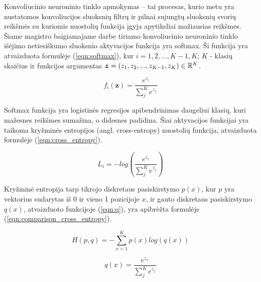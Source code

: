 Konvoliucinio neuroninio tinklo apmokymas -- tai procesas, kurio metu yra nustatomos konvoliucijos sluoksnių filtrų ir pilnai sujungtų sluoksnių svorių reikšmės su kuriomis nuostolių funkcija įgyja apytiksliai mažiausias reikšmes. Šiame magistro baigiamajame darbe tiriamo konvoliucinio neuroninio tinklo išėjimo netiesiškumo sluoksnio aktyvacijos funkcija yra softmax. Ši funkcija yra atvaizduota formulėje (\ref{eqn:softmax}), kur $i = 1, 2, ..., K - 1, K$; $K$ - klasių skaičius ir funkcijos argumentas $\boldsymbol{z} = (z_1, z_2, ..., z_{K - 1}, z_K) \in \mathbb{R}^K$.

\begin{equation}
\label{eqn:softmax}
	f_i(\boldsymbol{z}) = \dfrac{e^{z_i}}{\sum_{j}^{K} e^{z_j}}
\end{equation}

Softmax funkcija yra logistinės regresijos apibendrinimas daugeliui klasių, kuri mažesnes reikšmes sumažina, o didesnes padidina. Šiai aktyvacijos funkcijai yra taikoma kryžminės entropijos (angl. cross-entropy) nuostolių funkcija, atvaizduota formulėje (\ref{eqn:cross_entropy}).

\begin{equation}
\label{eqn:cross_entropy}
	L_i = - log(\dfrac{e^{z_i}}{\sum_{j}^{K} e^{z_j}})
\end{equation}

Kryžminė entropija tarp tikrojo diskretaus pasiskirstymo $p(x)$, kur $p$ yra vektorius sudarytas iš 0 ir vieno 1 pozicijoje $x$, ir gauto diskretaus pasiskirstymo $q(x)$, atvaizduoto funkcijoje (\ref{eqn:q}), yra apibrėžta formulėje (\ref{eqn:comparison_cross_entropy}).

\begin{equation}
\label{eqn:comparison_cross_entropy}
	H(p, q) = - \sum_{x = 1}^K p(x) log(q(x))
\end{equation}

\begin{equation}
\label{eqn:q}
	q(x) = \dfrac{e^{z_x}}{\sum_{j}^{K} e^{z_j}}
\end{equation}
